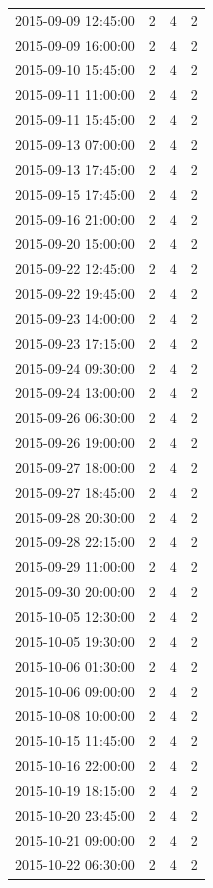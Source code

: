 \begin{tabular}{lrrr}
2015-09-09 12:45:00 & 2 & 4 & 2 \\
2015-09-09 16:00:00 & 2 & 4 & 2 \\
2015-09-10 15:45:00 & 2 & 4 & 2 \\
2015-09-11 11:00:00 & 2 & 4 & 2 \\
2015-09-11 15:45:00 & 2 & 4 & 2 \\
2015-09-13 07:00:00 & 2 & 4 & 2 \\
2015-09-13 17:45:00 & 2 & 4 & 2 \\
2015-09-15 17:45:00 & 2 & 4 & 2 \\
2015-09-16 21:00:00 & 2 & 4 & 2 \\
2015-09-20 15:00:00 & 2 & 4 & 2 \\
2015-09-22 12:45:00 & 2 & 4 & 2 \\
2015-09-22 19:45:00 & 2 & 4 & 2 \\
2015-09-23 14:00:00 & 2 & 4 & 2 \\
2015-09-23 17:15:00 & 2 & 4 & 2 \\
2015-09-24 09:30:00 & 2 & 4 & 2 \\
2015-09-24 13:00:00 & 2 & 4 & 2 \\
2015-09-26 06:30:00 & 2 & 4 & 2 \\
2015-09-26 19:00:00 & 2 & 4 & 2 \\
2015-09-27 18:00:00 & 2 & 4 & 2 \\
2015-09-27 18:45:00 & 2 & 4 & 2 \\
2015-09-28 20:30:00 & 2 & 4 & 2 \\
2015-09-28 22:15:00 & 2 & 4 & 2 \\
2015-09-29 11:00:00 & 2 & 4 & 2 \\
2015-09-30 20:00:00 & 2 & 4 & 2 \\
2015-10-05 12:30:00 & 2 & 4 & 2 \\
2015-10-05 19:30:00 & 2 & 4 & 2 \\
2015-10-06 01:30:00 & 2 & 4 & 2 \\
2015-10-06 09:00:00 & 2 & 4 & 2 \\
2015-10-08 10:00:00 & 2 & 4 & 2 \\
2015-10-15 11:45:00 & 2 & 4 & 2 \\
2015-10-16 22:00:00 & 2 & 4 & 2 \\
2015-10-19 18:15:00 & 2 & 4 & 2 \\
2015-10-20 23:45:00 & 2 & 4 & 2 \\
2015-10-21 09:00:00 & 2 & 4 & 2 \\
2015-10-22 06:30:00 & 2 & 4 & 2 \\

\end{tabular}
